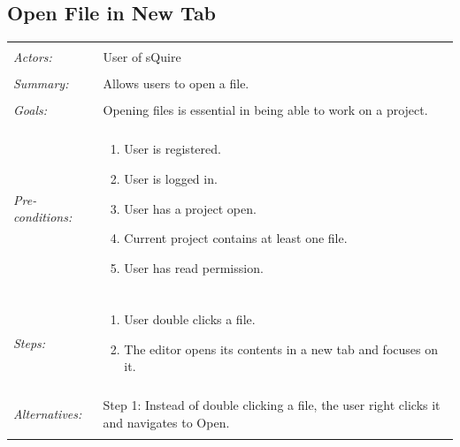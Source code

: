\documentclass[11pt]{report}
\begin{document}
\subsection{Open File in New Tab}
\begin{tabular}{ p{2cm} p{12cm} }
\hline
	\\
	\textit{Actors:} & User of sQuire \\
	\\
	\textit{Summary:} & Allows users to open a file. \\
	\\
	\textit{Goals:} & Opening files is essential in being able to work on a project. \\
	\\
	\textit{Pre-conditions:} &  \begin{enumerate}
		\item User is registered.
		\item User is logged in.
		\item User has a project open.
		\item Current project contains at least one file.
		\item User has read permission.
	\end{enumerate} \\
	\\
	\textit{Steps:} & \begin{enumerate}
		\item User double clicks a file.
		\item The editor opens its contents in a new tab and focuses on it.
	\end{enumerate} \\
	\\
	\textit{Alternatives:} & Step 1: Instead of double clicking a file, the user right clicks it and navigates to Open. \\
	\\
\hline
\end{tabular}
\newpage
\end{document}
